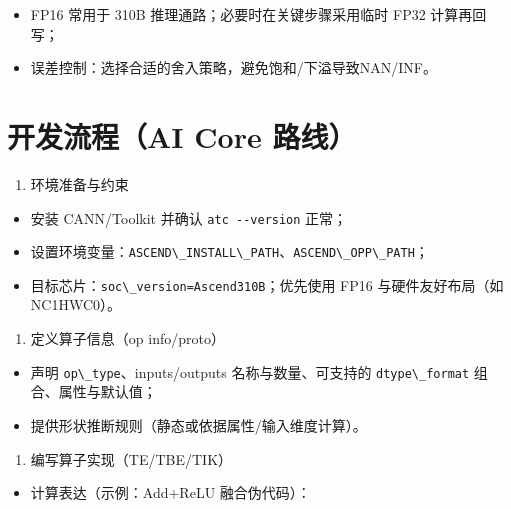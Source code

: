 \begin{itemize}
\tightlist
\item
  FP16 常用于 310B 推理通路；必要时在关键步骤采用临时 FP32 计算再回写；
\item
  误差控制：选择合适的舍入策略，避免饱和/下溢导致NAN/INF。
\end{itemize}

\section{开发流程（AI Core
路线）}\label{ux5f00ux53d1ux6d41ux7a0bai-core-ux8defux7ebf}

\begin{enumerate}
\def\labelenumi{\arabic{enumi}.}
\tightlist
\item
  环境准备与约束
\end{enumerate}

\begin{itemize}
\tightlist
\item
  安装 CANN/Toolkit 并确认 \passthrough{\lstinline!atc --version!}
  正常；
\item
  设置环境变量：\passthrough{\lstinline!ASCEND\_INSTALL\_PATH!}、\passthrough{\lstinline!ASCEND\_OPP\_PATH!}；
\item
  目标芯片：\passthrough{\lstinline!soc\_version=Ascend310B!}；优先使用
  FP16 与硬件友好布局（如NC1HWC0）。
\end{itemize}

\begin{enumerate}
\def\labelenumi{\arabic{enumi}.}
\setcounter{enumi}{1}
\tightlist
\item
  定义算子信息（op info/proto）
\end{enumerate}

\begin{itemize}
\tightlist
\item
  声明 \passthrough{\lstinline!op\_type!}、inputs/outputs
  名称与数量、可支持的 \passthrough{\lstinline!dtype\_format!}
  组合、属性与默认值；
\item
  提供形状推断规则（静态或依据属性/输入维度计算）。
\end{itemize}

\begin{enumerate}
\def\labelenumi{\arabic{enumi}.}
\setcounter{enumi}{2}
\tightlist
\item
  编写算子实现（TE/TBE/TIK）
\end{enumerate}

\begin{itemize}
\tightlist
\item
  计算表达（示例：Add+ReLU 融合伪代码）：
\end{itemize}

